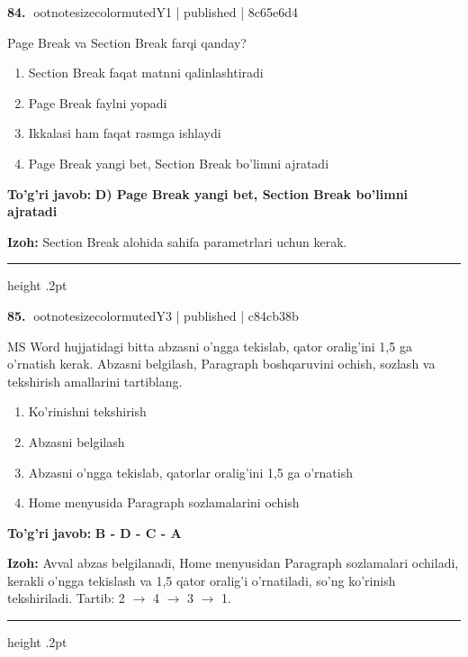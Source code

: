\documentclass[10pt,a4paper]{article}
\begin{document}
\textbf{\color{ink}84.} {ootnotesizecolor{muted}Y1 | published | 8c65e6d4}
\par
Page Break va Section Break farqi qanday?
\begin{enumerate}[label=\Alph*),leftmargin=9mm]
\item Section Break faqat matnni qalinlashtiradi
\item Page Break faylni yopadi
\item Ikkalasi ham faqat rasmga ishlaydi
\item Page Break yangi bet, Section Break bo'limni ajratadi
\end{enumerate}
\begin{tcolorbox}[enhanced,breakable,colback=teal!4,colframe=teal!55!black,boxrule=0.45pt,arc=1.2mm,left=2.8mm,right=2.8mm,top=2mm,bottom=2mm]
\textbf{\color{teal}To'g'ri javob:} \textbf{D) Page Break yangi bet, Section Break bo'limni ajratadi}
\par\smallskip
\textbf{Izoh:} Section Break alohida sahifa parametrlari uchun kerak.
\end{tcolorbox}
\vspace{2mm}\hrule height .2pt\vspace{2mm}

\textbf{\color{ink}85.} {ootnotesizecolor{muted}Y3 | published | c84cb38b}
\par
MS Word hujjatidagi bitta abzasni o'ngga tekislab, qator oralig'ini 1,5 ga o'rnatish kerak. Abzasni belgilash, Paragraph boshqaruvini ochish, sozlash va tekshirish amallarini tartiblang.
\begin{enumerate}[label=\Alph*),leftmargin=9mm]
\item Ko'rinishni tekshirish
\item Abzasni belgilash
\item Abzasni o'ngga tekislab, qatorlar oralig'ini 1,5 ga o'rnatish
\item Home menyusida Paragraph sozlamalarini ochish
\end{enumerate}
\begin{tcolorbox}[enhanced,breakable,colback=teal!4,colframe=teal!55!black,boxrule=0.45pt,arc=1.2mm,left=2.8mm,right=2.8mm,top=2mm,bottom=2mm]
\textbf{\color{teal}To'g'ri javob:} \textbf{B - D - C - A}
\par\smallskip
\textbf{Izoh:} Avval abzas belgilanadi, Home menyusidan Paragraph sozlamalari ochiladi, kerakli o'ngga tekislash va 1,5 qator oralig'i o'rnatiladi, so'ng ko'rinish tekshiriladi. Tartib: 2 \ensuremath{\rightarrow} 4 \ensuremath{\rightarrow} 3 \ensuremath{\rightarrow} 1.
\end{tcolorbox}
\vspace{2mm}\hrule height .2pt\vspace{2mm}
\end{document}
